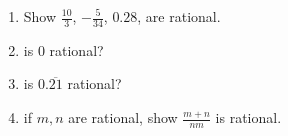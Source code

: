 \guard



\begin{exmp}
\label{exmp:someRationals}
  \begin{enumerate}
    \item Show $\frac{10}{3}$, $-\frac{5}{34}$, $0.28$, are rational. \\
    \item is $0$ rational?
    \item is $0.\overline{21}$ rational?
    \item if $m,n$ are rational, show $\frac{m+n}{nm}$ is rational.
  \end{enumerate}
\end{exmp}

